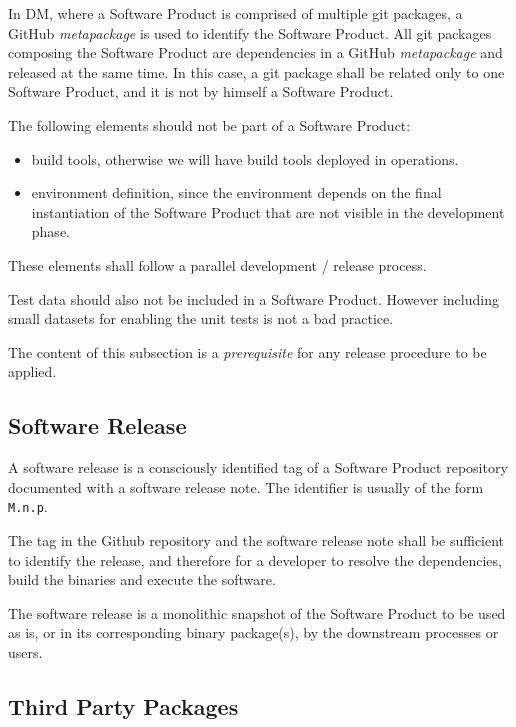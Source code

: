 In DM, where a Software Product is comprised of multiple git packages, a GitHub \textit{metapackage} is used to identify the Software Product.
All git packages composing the Software Product are dependencies in a GitHub \textit{metapackage} and released at the same time.
In this case, a git package shall be related only to one Software Product, and it is not by himself a Software Product.

The following elements should not be part of a Software Product:

\begin{itemize}
\item build tools, otherwise we will have build tools deployed in operations.
\item environment definition, since the environment depends on the final instantiation of the Software Product that are not visible in the development phase.
\end{itemize}

These elements shall follow a parallel development / release process.

Test data should also not be included in a Software Product. However including small datasets for enabling the unit tests is not a bad practice.

The content of this subsection is a \textit{prerequisite} for any release procedure to be applied.


\subsection{Software Release} \label{sec:defrelease}

A software release is a consciously identified tag of a Software Product repository documented with a software release note.
The identifier is usually of the form \texttt{M.n.p}.

The tag in the Github repository and the software release note shall be sufficient to identify the release, and therefore for a developer
to resolve the dependencies, build the binaries and execute the software.

The software release is a monolithic snapshot of the Software Product to be used as is, or in its corresponding binary package(s), by the downstream processes or users.


\subsection{Third Party Packages}


